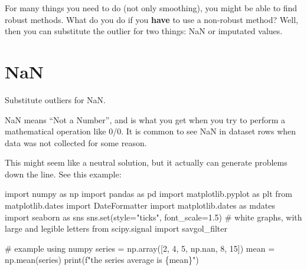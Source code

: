 \documentclass[
  letterpaper,
  DIV=11,
  numbers=noendperiod,
  oneside]{scrreprt}
\newenvironment{Shaded}{\begin{snugshade}}{\end{snugshade}}
\newcommand{\BuiltInTok}[1]{\textcolor[rgb]{0.00,0.23,0.31}{#1}}
\newcommand{\CommentTok}[1]{\textcolor[rgb]{0.37,0.37,0.37}{#1}}
\newcommand{\DecValTok}[1]{\textcolor[rgb]{0.68,0.00,0.00}{#1}}
\newcommand{\FloatTok}[1]{\textcolor[rgb]{0.68,0.00,0.00}{#1}}
\newcommand{\ImportTok}[1]{\textcolor[rgb]{0.00,0.46,0.62}{#1}}
\newcommand{\NormalTok}[1]{\textcolor[rgb]{0.00,0.23,0.31}{#1}}
\newcommand{\OperatorTok}[1]{\textcolor[rgb]{0.37,0.37,0.37}{#1}}
\newcommand{\SpecialCharTok}[1]{\textcolor[rgb]{0.37,0.37,0.37}{#1}}
\newcommand{\SpecialStringTok}[1]{\textcolor[rgb]{0.13,0.47,0.30}{#1}}
\newcommand{\StringTok}[1]{\textcolor[rgb]{0.13,0.47,0.30}{#1}}
\begin{document}
For many things you need to do (not only smoothing), you might be able
to find robust methods. What do you do if you \textbf{have} to use a
non-robust method? Well, then you can substitute the outlier for two
things: NaN or imputated values.

\hypertarget{nan}{%
\section{NaN}\label{nan}}

Substitute outliers for NaN.

NaN means ``Not a Number'', and is what you get when you try to perform
a mathematical operation like 0/0. It is common to see NaN in dataset
rows when data was not collected for some reason.

This might seem like a neutral solution, but it actually can generate
problems down the line. See this example:

\begin{Shaded}
\begin{Highlighting}[]
\ImportTok{import}\NormalTok{ numpy }\ImportTok{as}\NormalTok{ np}
\ImportTok{import}\NormalTok{ pandas }\ImportTok{as}\NormalTok{ pd}
\ImportTok{import}\NormalTok{ matplotlib.pyplot }\ImportTok{as}\NormalTok{ plt}
\ImportTok{from}\NormalTok{ matplotlib.dates }\ImportTok{import}\NormalTok{ DateFormatter}
\ImportTok{import}\NormalTok{ matplotlib.dates }\ImportTok{as}\NormalTok{ mdates}
\ImportTok{import}\NormalTok{ seaborn }\ImportTok{as}\NormalTok{ sns}
\NormalTok{sns.}\BuiltInTok{set}\NormalTok{(style}\OperatorTok{=}\StringTok{"ticks"}\NormalTok{, font\_scale}\OperatorTok{=}\FloatTok{1.5}\NormalTok{)  }\CommentTok{\# white graphs, with large and legible letters}
\ImportTok{from}\NormalTok{ scipy.signal }\ImportTok{import}\NormalTok{ savgol\_filter}
\end{Highlighting}
\end{Shaded}

\begin{Shaded}
\begin{Highlighting}[]
\CommentTok{\# example using numpy}
\NormalTok{series }\OperatorTok{=}\NormalTok{ np.array([}\DecValTok{2}\NormalTok{, }\DecValTok{4}\NormalTok{, }\DecValTok{5}\NormalTok{, np.nan, }\DecValTok{8}\NormalTok{, }\DecValTok{15}\NormalTok{])}
\NormalTok{mean }\OperatorTok{=}\NormalTok{ np.mean(series)}
\BuiltInTok{print}\NormalTok{(}\SpecialStringTok{f"the series average is }\SpecialCharTok{\{}\NormalTok{mean}\SpecialCharTok{\}}\SpecialStringTok{"}\NormalTok{)}
\end{Highlighting}
\end{Shaded}
\end{document}
